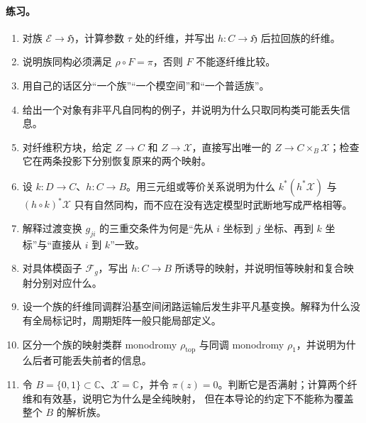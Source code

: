 \documentclass[UTF8,fontset=none,a4paper,11pt]{ctexart}
\theoremstyle{foundation-definition}
\theoremstyle{foundation-theorem}
\theoremstyle{foundation-proposition}
\theoremstyle{foundation-example}
\theoremstyle{foundation-remark}
\theoremstyle{foundation-theorem}
\begin{document}
\paragraph{练习。}
\begin{enumerate}[label=M8.\arabic*.]
  \item 对族 \(\mathcal E\to\mathfrak H\)，计算参数 \(\tau\) 处的纤维，并写出 \(h:C\to\mathfrak H\) 后拉回族的纤维。
  \item 说明族同构必须满足 \(\rho\circ F=\pi\)，否则 \(F\) 不能逐纤维比较。
  \item 用自己的话区分“一个族”“一个模空间”和“一个普适族”。
  \item 给出一个对象有非平凡自同构的例子，并说明为什么只取同构类可能丢失信息。
  \item 对纤维积方块，给定 \(Z\to C\) 和 \(Z\to\mathcal X\)，直接写出唯一的 \(Z\to C\times_B\mathcal X\)；检查它在两条投影下分别恢复原来的两个映射。
  \item 设 \(k:D\to C\)、\(h:C\to B\)。用三元组或等价关系说明为什么 \(k^*(h^*\mathcal X)\) 与 \((h\circ k)^*\mathcal X\) 只有自然同构，而不应在没有选定模型时武断地写成严格相等。
  \item 解释过渡变换 \(g_{ji}\) 的三重交条件为何是“先从 \(i\) 坐标到 \(j\) 坐标、再到 \(k\) 坐标”与“直接从 \(i\) 到 \(k\)”一致。
  \item 对具体模函子 \(\mathcal F_g\)，写出 \(h:C\to B\) 所诱导的映射，并说明恒等映射和复合映射分别对应什么。
  \item 设一个族的纤维同调群沿基空间闭路运输后发生非平凡基变换。解释为什么没有全局标记时，周期矩阵一般只能局部定义。
  \item 区分一个族的映射类群 monodromy \(\rho_{\mathrm{top}}\) 与同调 monodromy
    \(\rho_1\)，并说明为什么后者可能丢失前者的信息。
  \item 令 \(B=\{0,1\}\subset\mathbb C\)、\(\mathcal X=\mathbb C\)，并令
    \(\pi(z)=0\)。判断它是否满射；计算两个纤维和有效基，说明它为什么是全纯映射，
    但在本导论的约定下不能称为覆盖整个 \(B\) 的解析族。
\end{enumerate}
\end{document}
